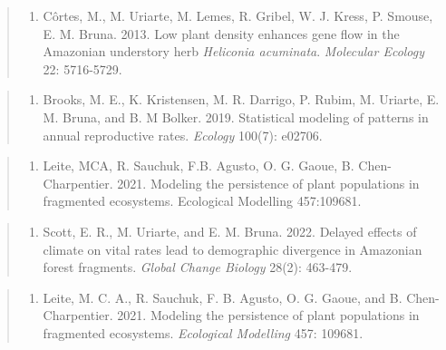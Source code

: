 \documentclass[
  12pt,
  man, donotrepeattitle,floatsintext]{apa6}
\providecommand{\tightlist}{%
  \setlength{\itemsep}{0pt}\setlength{\parskip}{0pt}}
\begin{document}
\begin{quote}
\begin{enumerate}
\def\labelenumi{\arabic{enumi}.}
\setcounter{enumi}{13}
\tightlist
\item
  Côrtes, M., M. Uriarte, M. Lemes, R. Gribel, W. J. Kress, P. Smouse, E. M. Bruna. 2013. Low plant density enhances gene flow in the Amazonian understory herb \emph{Heliconia acuminata}. \emph{Molecular Ecology} 22: 5716-5729.
\end{enumerate}
\end{quote}

\begin{quote}
\begin{enumerate}
\def\labelenumi{\arabic{enumi}.}
\setcounter{enumi}{14}
\tightlist
\item
  Brooks, M. E., K. Kristensen, M. R. Darrigo, P. Rubim, M. Uriarte, E. M. Bruna, and B. M Bolker. 2019. Statistical modeling of patterns in annual reproductive rates. \emph{Ecology} 100(7): e02706.
\end{enumerate}
\end{quote}

\begin{quote}
\begin{enumerate}
\def\labelenumi{\arabic{enumi}.}
\setcounter{enumi}{15}
\tightlist
\item
  Leite, MCA, R. Sauchuk, F.B. Agusto, O. G. Gaoue, B. Chen-Charpentier. 2021. Modeling the persistence of plant populations in fragmented ecosystems. Ecological Modelling 457:109681.
\end{enumerate}
\end{quote}

\begin{quote}
\begin{enumerate}
\def\labelenumi{\arabic{enumi}.}
\setcounter{enumi}{16}
\tightlist
\item
  Scott, E. R., M. Uriarte, and E. M. Bruna. 2022. Delayed effects of climate on vital rates lead to demographic divergence in Amazonian forest fragments. \emph{Global Change Biology} 28(2): 463-479.
\end{enumerate}
\end{quote}

\begin{quote}
\begin{enumerate}
\def\labelenumi{\arabic{enumi}.}
\setcounter{enumi}{17}
\tightlist
\item
  Leite, M. C. A., R. Sauchuk, F. B. Agusto, O. G. Gaoue, and B. Chen-Charpentier. 2021. Modeling the persistence of plant populations in fragmented ecosystems. \emph{Ecological Modelling} 457: 109681.
\end{enumerate}
\end{quote}
\end{document}
